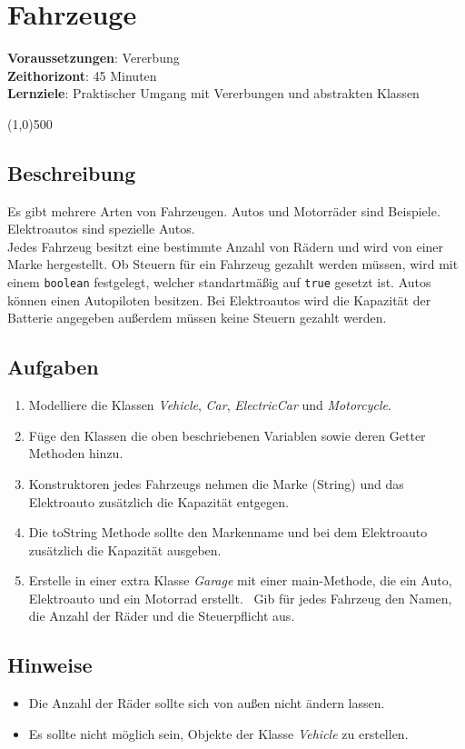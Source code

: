 

\chapter*{Fahrzeuge}

\headingfont
\parbox {\textwidth}{
    \textbf{Voraussetzungen}: Vererbung \\
    \textbf{Zeithorizont}: 45 Minuten \\
    \textbf{Lernziele}: Praktischer Umgang mit Vererbungen und abstrakten Klassen
}

\normalfont
\begin{center}
\line(1,0){500}
\end{center}
\vspace{1cm}

\section*{Beschreibung}
Es gibt mehrere Arten von Fahrzeugen. Autos und Motorräder sind Beispiele. Elektroautos sind spezielle Autos. \\
Jedes Fahrzeug besitzt eine bestimmte Anzahl von Rädern und wird von einer Marke hergestellt.
Ob Steuern für ein Fahrzeug gezahlt werden müssen, wird mit einem \texttt{boolean} festgelegt, welcher standartmäßig auf \texttt{true} gesetzt ist.
Autos können einen Autopiloten besitzen. Bei Elektroautos wird die Kapazität der Batterie angegeben außerdem müssen keine Steuern gezahlt werden.

\section*{Aufgaben}
\begin{enumerate}
     \item Modelliere die Klassen \textit{Vehicle}, \textit{Car}, \textit{ElectricCar} und \textit{Motorcycle}.
     \item Füge den Klassen die oben beschriebenen Variablen sowie deren Getter Methoden hinzu.
     \item Konstruktoren jedes Fahrzeugs nehmen die Marke (String) und das Elektroauto zusätzlich die Kapazität entgegen.
     \item Die toString Methode sollte den Markenname und bei dem Elektroauto zusätzlich die Kapazität ausgeben.
     \item Erstelle in einer extra Klasse \textit{Garage} mit einer main-Methode, die ein Auto, Elektroauto und ein Motorrad erstellt. \
            Gib für jedes Fahrzeug den Namen, die Anzahl der Räder und die Steuerpflicht aus.
\end{enumerate}

\section*{Hinweise}
\begin{itemize}
    \item Die Anzahl der Räder sollte sich von außen nicht ändern lassen.
    \item Es sollte nicht möglich sein, Objekte der Klasse \textit{Vehicle} zu erstellen.
\end{itemize}
